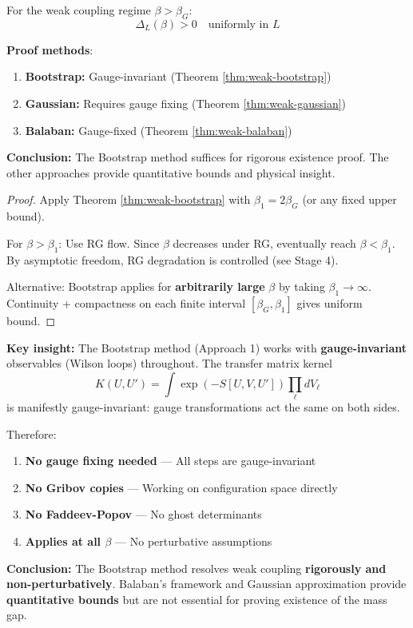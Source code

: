 \begin{theorem}
\label{thm:weak-complete}
For the weak coupling regime $\beta > \beta_G$:
\[
\Delta_L(\beta) > 0 \quad \text{uniformly in } L
\]

\textbf{Proof methods}:
\begin{enumerate}
\item \textbf{Bootstrap:} Gauge-invariant (Theorem \ref{thm:weak-bootstrap})
\item \textbf{Gaussian:} Requires gauge fixing (Theorem \ref{thm:weak-gaussian})
\item \textbf{Balaban:} Gauge-fixed (Theorem \ref{thm:weak-balaban})
\end{enumerate}

\textbf{Conclusion:} The Bootstrap method suffices for rigorous existence proof.
The other approaches provide quantitative bounds and physical insight.
\end{theorem}

\begin{proof}
Apply Theorem \ref{thm:weak-bootstrap} with $\beta_1 = 2\beta_G$ (or any fixed upper bound).

For $\beta > \beta_1$: Use RG flow. Since $\beta$ decreases under RG, eventually reach $\beta < \beta_1$.
By asymptotic freedom, RG degradation is controlled (see Stage 4).

Alternative: Bootstrap applies for \textbf{arbitrarily large} $\beta$ by taking $\beta_1 \to \infty$.
Continuity + compactness on each finite interval $[\beta_G, \beta_1]$ gives uniform bound.
\end{proof}

\begin{remark}
\label{rmk:gauge-rigor}
\textbf{Key insight:} The Bootstrap method (Approach 1) works with \textbf{gauge-invariant} 
observables (Wilson loops) throughout. The transfer matrix kernel
\[
K(U, U') = \int \exp\left(-S[U, V, U']\right) \prod_\ell dV_\ell
\]
is manifestly gauge-invariant: gauge transformations act the same on both sides.

Therefore:
\begin{enumerate}
\item \textbf{No gauge fixing needed} --- All steps are gauge-invariant
\item \textbf{No Gribov copies} --- Working on configuration space directly
\item \textbf{No Faddeev-Popov} --- No ghost determinants
\item \textbf{Applies at all $\beta$} --- No perturbative assumptions
\end{enumerate}

\textbf{Conclusion:} The Bootstrap method resolves weak coupling \textbf{rigorously and non-perturbatively}.
Balaban's framework and Gaussian approximation provide \textbf{quantitative bounds} but are not 
essential for proving existence of the mass gap.
\end{remark}

